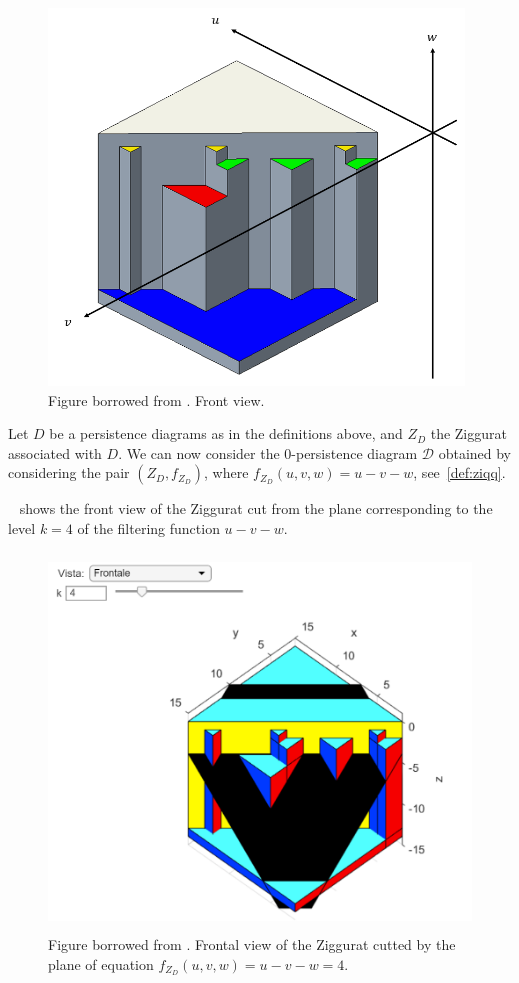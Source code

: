 \documentclass[english, LaM, oneside, noexaminfo]{sapthesis}
\begin{document}
\begin{figure}[tb]
\centering
\includegraphics[height=10cm]{Ziggurat 3.png}
\caption{Figure borrowed from \cite{student01_my_bachel}. Front view.}\label{fig:Ziggurat 3}
\end{figure}


Let $D$ be a persistence diagrams as in the definitions above, and $Z_D$ the Ziggurat associated with $D$. We can now consider the $0$-persistence diagram $\mathcal{D}$ obtained by considering the pair $(Z_D, f_{Z_D})$, where $f_{Z_D}(u, v, w) = u - v - w$, see~\cref{def:ziqq}.

~ shows the front view of the Ziggurat cut from the plane corresponding to the level $k = 4$ of the filtering function $u - v - w$.

\begin{figure}[tb]
\centering
\includegraphics[height=10cm]{Ziggurat 3D.png}
\caption{Figure borrowed from \cite{student01_my_bachel}. Frontal view of the Ziggurat cutted by the plane of equation $f_{Z_D}(u,v,w) = u-v-w = 4$.}\label{fig:Ziggurat 3D}
\end{figure}
\end{document}
